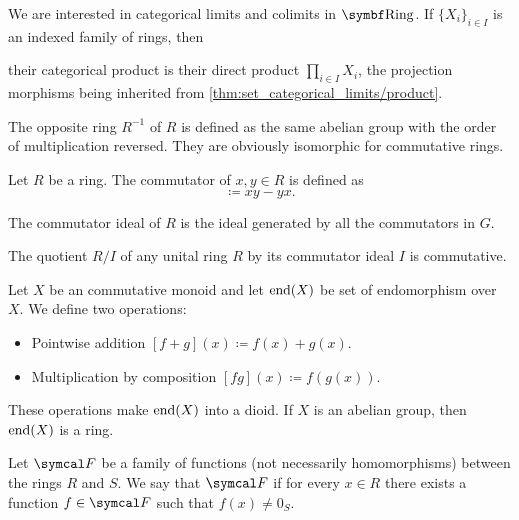 \begin{proposition}\label{thm:ring_categorical_limits}
  We are interested in categorical limits and colimits in \( \Cat{Ring} \). If \( \{ X_i \}_{i \in I} \) is an indexed family of rings, then
  \begin{defenum}
     their categorical product is their direct product \( \prod_{i \in I} X_i \), the projection morphisms being inherited from \cref{thm:set_categorical_limits/product}.
  \end{defenum}
\end{proposition}

\begin{definition}\label{def:opposite_ring}\cite[555]{Knapp2016BAlg}
  The opposite ring \( R^{-1} \) of \( R \) is defined as the same abelian group with the order of multiplication reversed. They are obviously isomorphic for commutative rings.
\end{definition}

\begin{definition}\label{def:ring_commutator}
  Let \( R \) be a ring. The commutator of \( x, y \in R \) is defined as
  \begin{equation*}
    [x, y] \coloneqq xy - yx.
  \end{equation*}

  The commutator ideal of \( R \) is the ideal generated by all the commutators in \( G \).
\end{definition}

\begin{proposition}\label{thm:quotient_by_commutator_ideal}
  The quotient \( R / I \) of any unital ring \( R \) by its commutator ideal \( I \) is commutative.
\end{proposition}

\begin{definition}\label{def:endomorphism_semiring}
  Let \( X \) be an commutative monoid and let \( \operatorname{end}(X) \) be set of endomorphism over \( X \). We define two operations:
  \begin{itemize}
    \item Pointwise addition \( [f + g](x) \coloneqq f(x) + g(x) \).
    \item Multiplication by composition \( [fg](x) \coloneqq f(g(x)) \).
  \end{itemize}

  These operations make \( \operatorname{end}(X) \) into a dioid. If \( X \) is an abelian group, then \( \operatorname{end}(X) \) is a ring.
\end{definition}

\begin{definition}\label{def:functions_vanish_nowhere}
  Let \( \Cal{F} \) be a family of functions (not necessarily homomorphisms) between the rings \( R \) and \( S \). We say that \( \Cal{F} \)  if for every \( x \in R \) there exists a function \( f \in \Cal{F} \) such that \( f(x) \neq 0_S \).
\end{definition}
